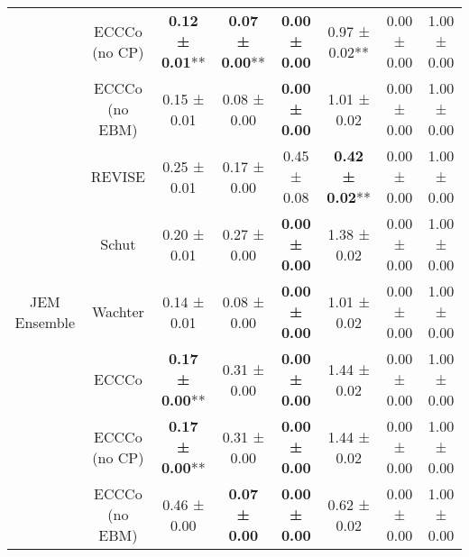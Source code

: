 \begin{table}
{\begin{tabular}[t]{cccccccc}
 & ECCCo (no CP) & \textbf{0.12 ± 0.01}** & \textbf{0.07 ± 0.00}** & \textbf{0.00 ± 0.00}\hphantom{*}\hphantom{*} & 0.97 ± 0.02** & 0.00 ± 0.00\hphantom{*}\hphantom{*} & 1.00 ± 0.00\hphantom{*}\hphantom{*}\\

 & ECCCo (no EBM) & 0.15 ± 0.01\hphantom{*}\hphantom{*} & 0.08 ± 0.00\hphantom{*}\hphantom{*} & \textbf{0.00 ± 0.00}\hphantom{*}\hphantom{*} & 1.01 ± 0.02\hphantom{*}\hphantom{*} & 0.00 ± 0.00\hphantom{*}\hphantom{*} & 1.00 ± 0.00\hphantom{*}\hphantom{*}\\

 & REVISE & 0.25 ± 0.01\hphantom{*}\hphantom{*} & 0.17 ± 0.00\hphantom{*}\hphantom{*} & 0.45 ± 0.08\hphantom{*}\hphantom{*} & \textbf{0.42 ± 0.02}** & 0.00 ± 0.00\hphantom{*}\hphantom{*} & 1.00 ± 0.00\hphantom{*}\hphantom{*}\\

 & Schut & 0.20 ± 0.01\hphantom{*}\hphantom{*} & 0.27 ± 0.00\hphantom{*}\hphantom{*} & \textbf{0.00 ± 0.00}\hphantom{*}\hphantom{*} & 1.38 ± 0.02\hphantom{*}\hphantom{*} & 0.00 ± 0.00\hphantom{*}\hphantom{*} & 1.00 ± 0.00\hphantom{*}\hphantom{*}\\

\multirow[t]{-6}{*}{\centering\arraybackslash JEM Ensemble} & Wachter & 0.14 ± 0.01\hphantom{*}\hphantom{*} & 0.08 ± 0.00\hphantom{*}\hphantom{*} & \textbf{0.00 ± 0.00}\hphantom{*}\hphantom{*} & 1.01 ± 0.02\hphantom{*}\hphantom{*} & 0.00 ± 0.00\hphantom{*}\hphantom{*} & 1.00 ± 0.00\hphantom{*}\hphantom{*}\\
\cmidrule{1-8}
 & ECCCo & \textbf{0.17 ± 0.00}** & 0.31 ± 0.00\hphantom{*}\hphantom{*} & \textbf{0.00 ± 0.00}\hphantom{*}\hphantom{*} & 1.44 ± 0.02\hphantom{*}\hphantom{*} & 0.00 ± 0.00\hphantom{*}\hphantom{*} & 1.00 ± 0.00\hphantom{*}\hphantom{*}\\

 & ECCCo (no CP) & \textbf{0.17 ± 0.00}** & 0.31 ± 0.00\hphantom{*}\hphantom{*} & \textbf{0.00 ± 0.00}\hphantom{*}\hphantom{*} & 1.44 ± 0.02\hphantom{*}\hphantom{*} & 0.00 ± 0.00\hphantom{*}\hphantom{*} & 1.00 ± 0.00\hphantom{*}\hphantom{*}\\

 & ECCCo (no EBM) & 0.46 ± 0.00\hphantom{*}\hphantom{*} & \textbf{0.07 ± 0.00}\hphantom{*}\hphantom{*} & \textbf{0.00 ± 0.00}\hphantom{*}\hphantom{*} & 0.62 ± 0.02\hphantom{*}\hphantom{*} & 0.00 ± 0.00\hphantom{*}\hphantom{*} & 1.00 ± 0.00\hphantom{*}\hphantom{*}\\


\end{tabular}}
\end{table}
